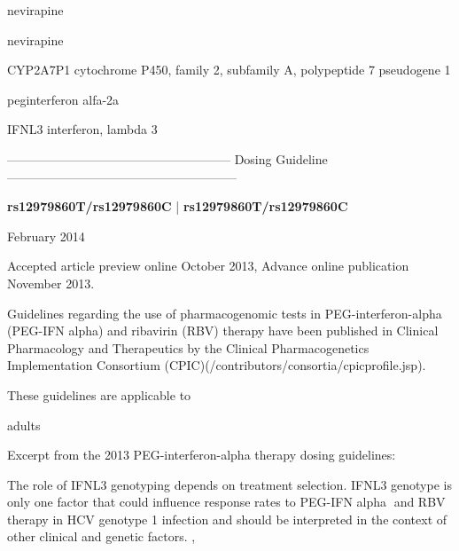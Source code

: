 \documentclass{resume} %
\begin{document}
\begin{rSection}{ nevirapine }
\end{rSection}\begin{rSection}{ nevirapine }
\item[]
\begin{rSubsection}{ CYP2A7P1 }{ cytochrome P450, family 2, subfamily A, polypeptide 7 pseudogene 1 }{}{}
\item[]


\end{rSubsection}

\end{rSection}\begin{rSection}{ peginterferon alfa-2a }
\item[]
\begin{rSubsection}{ IFNL3 }{ interferon, lambda 3 }{}{}
\item[]
\item[] ------------------------------------------------------ Dosing Guideline --------------------------------------------------------\newline
\item[]
\item[] \textbf{ rs12979860T/rs12979860C } | \textbf{ rs12979860T/rs12979860C }
\item February 2014
 \newline
\item Accepted article preview online October 2013,  Advance online publication November 2013.
 \newline
\item Guidelines regarding the use of pharmacogenomic tests in PEG-interferon-alpha (PEG-IFN alpha) and ribavirin (RBV) therapy have been published in Clinical Pharmacology and Therapeutics by the Clinical Pharmacogenetics Implementation Consortium (CPIC)(/contributors/consortia/cpicprofile.jsp).
 \newline
\item These guidelines are applicable to 
 \newline
\item adults
 \newline
\item Excerpt from the 2013 PEG-interferon-alpha therapy dosing guidelines:
 \newline
\item The role of IFNL3 genotyping depends on treatment selection. IFNL3 genotype is only one factor that could influence response rates to PEG-IFN alpha and RBV therapy in HCV genotype 1 infection and should be interpreted in the context of other clinical and genetic factors. , 

\end{rSubsection}
\end{rSection}
\end{document}
